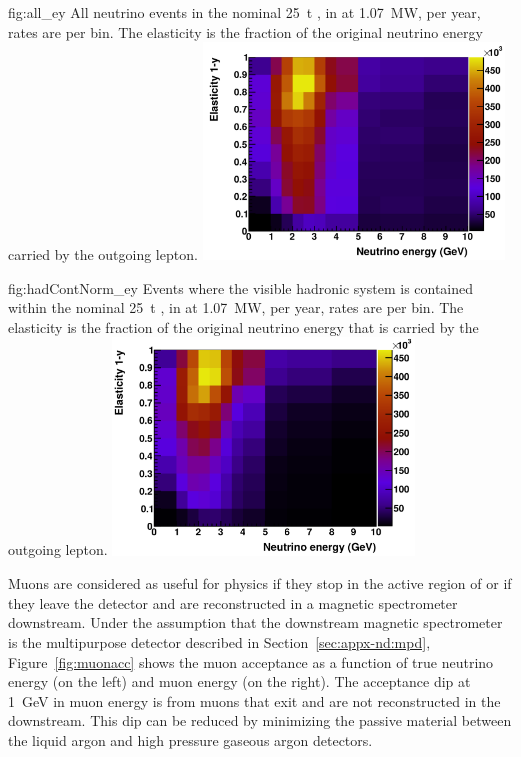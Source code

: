 \begin{dunefigure}{fig:all_ey}
{All neutrino events in the nominal \SI{25}{\tonne} , in  at \SI{1.07}{\mega\watt}, per year, rates are per bin. The elasticity is the fraction of the original neutrino energy carried by the outgoing lepton.}
	\includegraphics[width=0.6\textwidth]{graphics/all_ey.png}
\end{dunefigure}


\begin{dunefigure}{fig:hadContNorm_ey}
{Events where the visible hadronic system is contained within the nominal \SI{25}{\tonne} , in  at \SI{1.07}{\mega\watt}, per year, rates are per bin.  The elasticity is the fraction of the original neutrino energy that is carried by the outgoing lepton.}
	\includegraphics[width=0.6\textwidth]{graphics/hadContNorm_ey.png}
\end{dunefigure}

\label{sec:appx-nd:muacc}

Muons are considered as useful for physics if they stop in the active region of  or if they leave the  detector and are reconstructed in a magnetic spectrometer downstream.  Under the assumption that the downstream magnetic spectrometer is the multipurpose detector described in Section~\ref{sec:appx-nd:mpd}, Figure~\ref{fig:muonacc}  shows the muon acceptance as a function of true neutrino energy (on the left) and muon energy (on the right). The acceptance dip at \SI{1}{GeV} in muon energy is from muons that exit  and are not reconstructed in the  downstream. This dip can be reduced by minimizing the passive material between the liquid argon and high pressure gaseous argon detectors.

